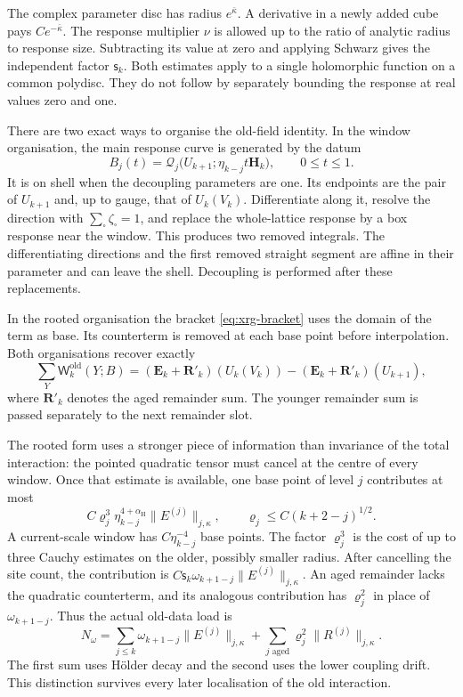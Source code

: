 \documentclass[11pt,letterpaper,reqno]{amsart}
\theoremstyle{definition}
\theoremstyle{remark}
\begin{document}
The complex parameter disc has radius
$e^{\bar\kappa}$. A derivative in a newly
added cube pays $Ce^{-\bar\kappa}$.
The response multiplier $\nu$ is allowed up
to the ratio of analytic radius to response
size. Subtracting its value at zero and
applying Schwarz gives the independent factor
$\mathsf s_k$. Both estimates apply to a
single holomorphic function on a common
polydisc. They do not follow by separately
bounding the response at real values zero
and one.

There are two exact ways to organise the
old-field identity. In the window organisation,
the main response curve is generated by the
datum
\[
 B_j(t)=\mathcal Q_j\big(U_{k+1};
                        \eta_{k-j}t\mathbf H_k\big),
                 \qquad 0\le t\le1.
\]
It is on shell when the decoupling parameters
are one. Its endpoints are the pair of
$U_{k+1}$ and, up to gauge, that of $U_k(V_k)$.
Differentiate along it, resolve the direction
with $\sum_\square\zeta_\square=1$, and
replace the whole-lattice response by a box
response near the window. This produces two
removed integrals. The differentiating
directions and the first removed straight
segment are affine in their parameter and
can leave the shell. Decoupling is performed
after these replacements.

In the rooted organisation the bracket
\eqref{eq:xrg-bracket} uses the domain of
the term as base. Its counterterm is removed
at each base point before interpolation.
Both organisations recover exactly
\begin{equation}\label{eq:xrg-old-sum-rule}
 \sum_Y\mathsf W_k^{\mathrm{old}}(Y;B)
 = (\mathbf E_k+\mathbf R'_k)(U_k(V_k))
                  -(\mathbf E_k+\mathbf R'_k)(U_{k+1}),
\end{equation}
where $\mathbf R'_k$ denotes the aged remainder
sum. The younger remainder sum is passed
separately to the next remainder slot.

The rooted form uses a stronger piece of
information than invariance of the total
interaction: the pointed quadratic tensor
must cancel at the centre of every window.
Once that estimate is available, one base
point of level $j$ contributes at most
\[
 C\varrho_j^3\eta_{k-j}^{4+\alpha_{\mathrm H}}
             \|E^{(j)}\|_{j,\kappa},
 \qquad \varrho_j\le C(k+2-j)^{1/2}.
\]
A current-scale window has $C\eta_{k-j}^{-4}$
base points. The factor $\varrho_j^3$ is the
cost of up to three Cauchy estimates on the
older, possibly smaller radius. After
cancelling the site count, the contribution
is
$C\mathsf s_k\omega_{k+1-j}\|E^{(j)}\|_{j,\kappa}$.
An aged remainder lacks the quadratic
counterterm, and its analogous contribution
has $\varrho_j^2$ in place of $\omega_{k+1-j}$.
Thus the actual old-data load is
\begin{equation}\label{eq:xrg-old-load}
 N_\omega=
 \sum_{j\le k}\omega_{k+1-j}\|E^{(j)}\|_{j,\kappa}
       +\sum_{j\text{ aged}}\varrho_j^2
                              \|R^{(j)}\|_{j,\kappa}.
\end{equation}
The first sum uses H\"older decay and the
second uses the lower coupling drift.
This distinction survives every later
localisation of the old interaction.
\end{document}
